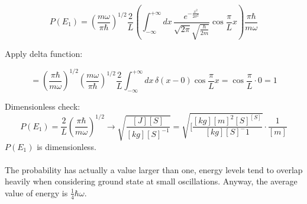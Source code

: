 $$P\left(E_{1}\right)=\left(\frac{m \omega}{ \pi \hbar}\right)^{1 / 2} \frac{2}{L}\left(\int_{-\infty}^{+\infty} d x\, \frac{e^{-\frac{x^{2}}{2\sigma^2}}}{\sqrt{2 \pi} \sqrt{\frac{\hbar}{2 m}}} \cos \frac{\pi}{L} x\right) \frac{ \pi \hbar}{m \omega}$$

\noindent
Apply delta function:

$$=\left(\frac{ \pi \hbar}{m\omega}\right)^{1 / 2}\left(\frac{m \omega}{ \pi \hbar}\right)^{1 / 2} \frac{2}{L}\int_{-\infty}^{+\infty} d x\, \delta(x-0) \cos \frac{\pi}{L} x=\cos \frac{\pi}{L} \cdot0=1$$

\noindent
Dimensionless check:
$$P\left(E_{1}\right)=\frac{2}{L}\left(\frac{ \pi \hbar}{m \omega}\right)^{1 / 2} \rightarrow \sqrt{\frac{[J][S]}{[k g][S]^{-1}}}=\sqrt{[\frac{[kg][m]^2[S]^[S]}{[kg][S]^-1}} \cdot \frac{1}{[m]}$$
$P\left(E_{1}\right)$ is dimensionless.\\
\\
\noindent
The probability has actually a value larger than one, energy levels tend to overlap heavily when considering ground state at small oscillations.
Anyway, the average value of energy is $\frac{1}{4}\hbar\omega$.
